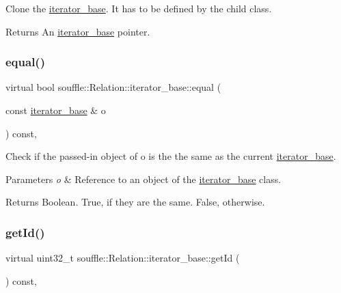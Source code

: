 Clone the \hyperlink{classsouffle_1_1_relation_1_1iterator__base}{iterator\+\_\+base}. It has to be defined by the child class. \begin{DoxyReturn}{Returns}
An \hyperlink{classsouffle_1_1_relation_1_1iterator__base}{iterator\+\_\+base} pointer. 
\end{DoxyReturn}
\mbox{\label{classsouffle_1_1_relation_1_1iterator__base_a7436b8e5dcc40cef6ed56684fbbc126e}} 
\subsubsection{\texorpdfstring{equal()}{equal()}}
{\footnotesize\ttfamily virtual bool souffle\+::\+Relation\+::iterator\+\_\+base\+::equal (\begin{DoxyParamCaption}\item[{const \hyperlink{classsouffle_1_1_relation_1_1iterator__base}{iterator\+\_\+base} \&}]{o }\end{DoxyParamCaption}) const\hspace{0.3cm}{\ttfamily [protected]}, {}}

Check if the passed-\/in object of o is the the same as the current \hyperlink{classsouffle_1_1_relation_1_1iterator__base}{iterator\+\_\+base}. 
\begin{DoxyParams}{Parameters}
{\em o} & Reference to an object of the \hyperlink{classsouffle_1_1_relation_1_1iterator__base}{iterator\+\_\+base} class. \\
\hline
\end{DoxyParams}
\begin{DoxyReturn}{Returns}
Boolean. True, if they are the same. False, otherwise. 
\end{DoxyReturn}
\mbox{\label{classsouffle_1_1_relation_1_1iterator__base_a6ff02f8a975c858f6d31941f19e95f08}} 
\subsubsection{\texorpdfstring{get\+Id()}{getId()}}
{\footnotesize\ttfamily virtual uint32\+\_\+t souffle\+::\+Relation\+::iterator\+\_\+base\+::get\+Id (\begin{DoxyParamCaption}{ }\end{DoxyParamCaption}) const\hspace{0.3cm}{\ttfamily [inline]}, {\ttfamily [virtual]}}

